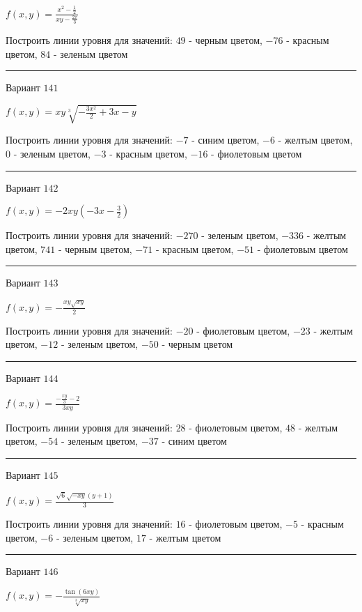 \documentclass[11pt]{report}
\begin{document}
$f(x, y) = \frac{x^{2} - \frac{1}{2}}{x y - \frac{2 x}{3}}$

Построить линии уровня для значений: $49$ - черным цветом, $-76$ - красным цветом, $84$ - зеленым цветом
\begin{center}
\noindent\rule{8cm}{0.4pt}
\end{center}
Вариант $141$


$f(x, y) = x y \sqrt[3]{- \frac{3 x^{2}}{2} + 3 x - y}$

Построить линии уровня для значений: $-7$ - синим цветом, $-6$ - желтым цветом, $0$ - зеленым цветом, $-3$ - красным цветом, $-16$ - фиолетовым цветом
\begin{center}
\noindent\rule{8cm}{0.4pt}
\end{center}
Вариант $142$


$f(x, y) = - 2 x y \left(- 3 x - \frac{3}{2}\right)$

Построить линии уровня для значений: $-270$ - зеленым цветом, $-336$ - желтым цветом, $741$ - черным цветом, $-71$ - красным цветом, $-51$ - фиолетовым цветом
\begin{center}
\noindent\rule{8cm}{0.4pt}
\end{center}
Вариант $143$


$f(x, y) = - \frac{x y \sqrt{x y}}{2}$

Построить линии уровня для значений: $-20$ - фиолетовым цветом, $-23$ - желтым цветом, $-12$ - зеленым цветом, $-50$ - черным цветом
\begin{center}
\noindent\rule{8cm}{0.4pt}
\end{center}
Вариант $144$


$f(x, y) = \frac{- \frac{x y}{3} - 2}{3 x y}$

Построить линии уровня для значений: $28$ - фиолетовым цветом, $48$ - желтым цветом, $-54$ - зеленым цветом, $-37$ - синим цветом
\begin{center}
\noindent\rule{8cm}{0.4pt}
\end{center}
Вариант $145$


$f(x, y) = \frac{\sqrt{6} \sqrt{- x y} \left(y + 1\right)}{3}$

Построить линии уровня для значений: $16$ - фиолетовым цветом, $-5$ - красным цветом, $-6$ - зеленым цветом, $17$ - желтым цветом
\begin{center}
\noindent\rule{8cm}{0.4pt}
\end{center}
Вариант $146$


$f(x, y) = - \frac{\tan{\left(6 x y \right)}}{\sqrt[3]{x y}}$
\end{document}
